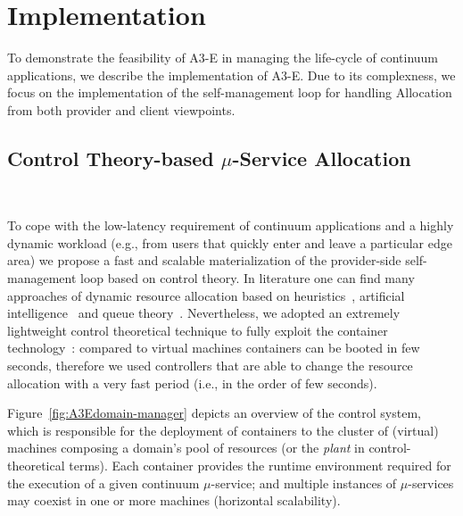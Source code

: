 \section{Implementation}\label{sec:implementation}


To demonstrate the feasibility of A3-E in managing the life-cycle of continuum applications, we describe the implementation of A3-E. Due to its complexness, we focus on the implementation of the self-management loop for handling Allocation from both provider and client viewpoints. 

\subsection{Control Theory-based $\mu$-Service Allocation}~\label{sec:ps_allocation}

To cope with the low-latency requirement of continuum applications and a highly dynamic workload  (e.g., from users that quickly enter and leave a particular edge area) we 
propose a fast and scalable materialization of the provider-side self-management loop based on control theory. In literature one can find many approaches of dynamic resource allocation based on heuristics~\cite{dustdar0}, artificial intelligence~\cite{ia1} and queue theory~\cite{queue1}. Nevertheless, we adopted an extremely lightweight control theoretical technique to fully exploit the container technology~\cite{Quatrocchi2016discrete}: compared to virtual machines containers can be booted in few seconds, therefore we used controllers that are able to change the resource allocation with a very fast period (i.e., in the order of few seconds).

Figure~\ref{fig:A3Edomain-manager} depicts an overview of the control system, which is responsible for the deployment of containers to the cluster of (virtual) machines composing a domain's pool of resources (or the \textit{plant} in control-theoretical terms). Each container provides the runtime environment required for the execution of a given continuum $\mu$-service; and multiple instances of $\mu$-services may coexist in one or more machines (horizontal scalability).


